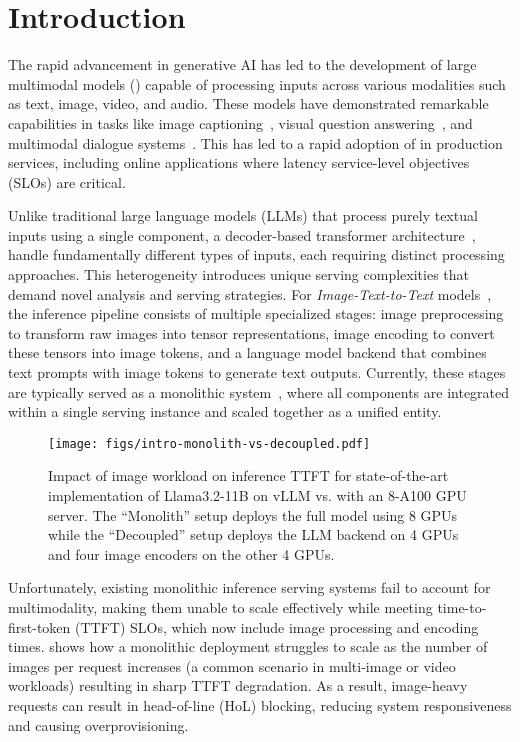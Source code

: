 \section{Introduction}

\noindent
The rapid advancement in generative AI has led to the development of large multimodal models (\lmms{}) capable of processing inputs across various modalities such as text, image, video, and audio.
These models have demonstrated remarkable capabilities in tasks like image captioning~\cite{chen2022visualgpt,mokady2021clipcap,hu2023promptcap}, visual question answering~\cite{schwenk2022okvqa,shao2023prompting}, and multimodal dialogue systems~\cite{li2024llava,chen2024internvl,team2024gemini}.
This has led to a rapid adoption of \lmms{} in production services, including online applications where latency service-level objectives (SLOs) are critical.

Unlike traditional large language models (LLMs) that process purely textual inputs using a single component, a decoder-based transformer architecture~\cite{transformer}, \lmms{} handle fundamentally different types of inputs, each requiring distinct processing approaches.
This heterogeneity introduces unique serving complexities that demand novel analysis and serving strategies.
For \textit{Image-Text-to-Text} models~\cite{ittt}, the inference pipeline consists of multiple specialized stages:
image preprocessing to transform raw images into tensor representations, image encoding to convert these tensors into image tokens, and a language model backend that combines text prompts with image tokens to generate text outputs.
Currently, these stages are typically served as a monolithic system~\cite{vllm,hf,deepspeed}, where all components are integrated within a single serving instance and scaled together as a unified entity.

\begin{figure}[!t]
    \raggedright
    \texttt{[image: figs/intro-monolith-vs-decoupled.pdf]}
    \caption{Impact of image workload on \lmm{} inference TTFT for state-of-the-art implementation of Llama3.2-11B on vLLM vs. \sysname{} with an 8-A100 GPU server.
    The ``Monolith'' setup deploys the full model using 8 GPUs while the ``Decoupled'' setup deploys the LLM backend on 4 GPUs and four image encoders on the other 4 GPUs.
    }
    \label{fig:monolith-vs-decoupled}
\end{figure}

Unfortunately, existing monolithic inference serving systems fail to account for multimodality, making them unable to scale effectively while meeting time-to-first-token (TTFT) SLOs, which now include image processing and encoding times.
 shows how a monolithic deployment struggles to scale as the number of images per request increases (a common scenario in multi-image or video workloads) resulting in sharp TTFT degradation.
As a result, image-heavy requests can result in head-of-line (HoL) blocking, reducing system responsiveness and causing overprovisioning.


